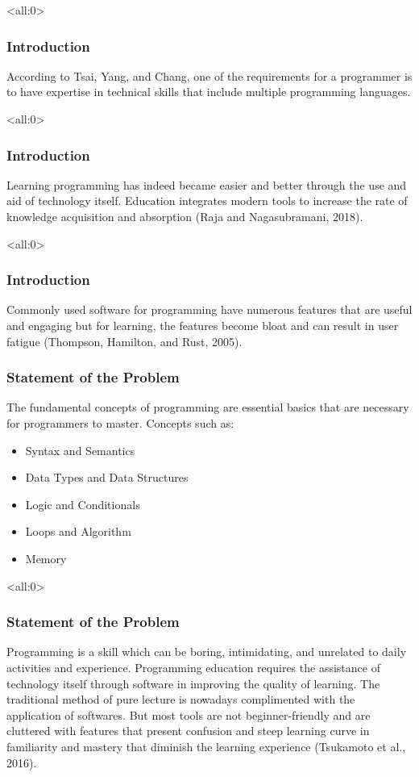 \documentclass{beamer}
\newcommand{\parx}{
	\setlength{\parindent}{4em}
	\par}
\begin{document}
\begin{frame}<all:0>
	\frametitle{Introduction}
	\justifying
	\parx
	According to Tsai, Yang, and Chang, one of the requirements for a programmer
	is to have expertise in technical skills that include multiple programming
	languages.
\end{frame}

\begin{frame}<all:0>
	\frametitle{Introduction}
	\justifying
	\parx
	Learning programming has indeed became easier and better through the use and
	aid of technology itself. Education integrates modern tools to increase the
	rate of knowledge acquisition and absorption (Raja and Nagasubramani, 2018).
\end{frame}

\begin{frame}<all:0>
	\frametitle{Introduction}
	\justifying
	\parx
	Commonly used software for programming have numerous features that are useful
	and engaging but for learning, the features become bloat and can result in
	user fatigue (Thompson, Hamilton, and Rust, 2005).
\end{frame}

\begin{frame}
	\frametitle{Statement of the Problem}
	\justifying
	\parx
	The fundamental concepts of programming are essential basics that are necessary
	for programmers to master. Concepts such as:

	\begin{itemize}
			\item<1-> Syntax and Semantics
			\item<2-> Data Types and Data Structures
			\item<3-> Logic and Conditionals
			\item<4-> Loops and Algorithm
			\item<5-> Memory
	\end{itemize}

\end{frame}

\begin{frame}<all:0>
	\frametitle{Statement of the Problem}
	\justifying
	\parx
	Programming is a skill which can be boring, intimidating, and unrelated to
	daily activities and experience. Programming education requires the
	assistance of technology itself through software in improving the quality of
	learning. The traditional method of pure lecture is nowadays complimented
	with the application of softwares. But most tools are not beginner-friendly
	and are cluttered with features that present confusion and steep learning
	curve in familiarity and mastery that diminish the learning experience
	(Tsukamoto et al., 2016).
\end{frame}
\end{document}
